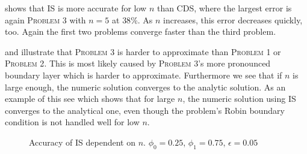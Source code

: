 \documentclass[../00_main.tex]{subfiles}
\begin{document}
 shows that IS is more accurate for low $n$ than CDS, where
the largest error is again \textsc{Problem 3} with $n=5$ at $38\%$. As $n$ 
increases, this error decreases quickly, too. Again the first two problems 
converge faster than the third problem. 

 and  illustrate that \textsc{Problem 3} 
is harder to approximate than \textsc{Problem 1} or \textsc{Problem 2}. This is 
most likely caused by \textsc{Problem 3}'s more pronounced boundary layer which 
is harder to approximate. Furthermore we see that if $n$ is large enough, the 
numeric solution converges to the analytic solution. As an example of this see 
 which shows that for large $n$, the numeric solution 
using IS converges to the analytical one, even though the problem's Robin 
boundary condition is not handled well for low $n$.

\begin{figure}[h]
\centering{}
    \vspace{-20pt}
    \caption{Accuracy of IS dependent on $n$. $\phi_0=0.25$, 
    $\phi_1=0.75$, $\epsilon=0.05$}
\label{fig:err_is}
\end{figure}
\end{document}
